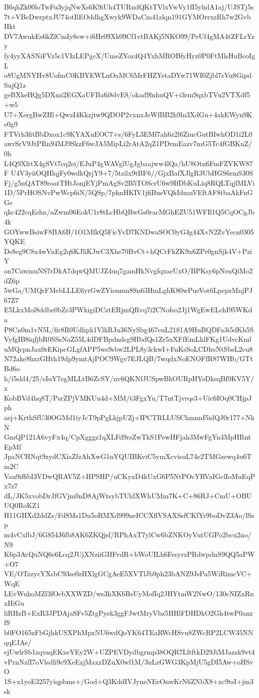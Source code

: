 B6qhZk00loTwFu3yjqNwXs6K9iUh4TURndQKtTVlxVwVy1fI5yhdA1aj/UJSTj5s
7t+VBeDwrptxJU74otIlEOddhgXwyk9WDaCm41zlqn191GYMOrrxzRh7w2GvbHkt
DV7AwukEs6kZlCmIy8ew+i6Hr09Xk09Cf1vtBAKj5NKO99/PeUf4gMA4tZFLrYzy
fy4yyXASNiFVz5c1VIzLEPgcX/UmeZYoz4Q4YxhMROBfyHyz0P0FtMlsHuBcoIgL
o8UgMNYHv8UofmC0KBYEWLnOaMC6MrFHZYetaDYw71WI0Zjbl7sVu8GipdSujQ1z
geBXkeHQg5DXmi2EGXaUFBa6i8dvE8/okad9lnhuQV+i3rm9qxbTVu2VTXdf5+w5
U7+XergBwZHl+QwzI4Kkzjtw9QDOP2vxnxJeWfBB2h9ln3XdGu+4akEWyn9Ke0g9
FTVrh3fitBbDxox1c9KYAXuEOC7+s/6FyL3EMf7ah6z2l6ZiucGutBIwhOD1i2L0
awrSrV9JtPRn94MJ9SkzF6wJA5MipLi2rAtA2qZ1PDrmEazv7mG5Tc4fGBKnZ/0h
L4Q9XlttX4gSVt7cq2ei/EJuP4gWAVglUgJgbaajww4lQa/hU8Otn6FmFZVKW87F
U4V3yiiOQHlqjFy0wdkQrjY9+7/5tzilx9tBF6//GjxBafXJlgR3UbHGS6rmS30S
Fj/g5nQAT89roatTHtJonjEYjPmAgSv2B5TOScrU6w9IfDbKuLiq8RQLTqjlMLVi
1D/5PrHOSNvPwWcp6iN/5QSp/7phnHKIV1jfiBueVQkIdmnVEftAF8tbaAkFnGGe
qkc422cqEshn/nZwm06EokU1r8tLcHbQBwGs0racMGhEZU51WFIl1Q5CqOCgJb4k
GOYwwBsiwF8BA6B/1O1MfkQ5FicYvD7KNDwaSOC0yG4g44XvN2ZvYecn0305YQKE
Ds8eg9C8x4wVnEg2q6KJliKJwC3Xhe70BvCt+hQCrFkZK9x6ZPr0gnSjk4V+PziY
on7CawmuNS7rDkA7dqwQMUJZ4uq7gamHkNvgfqxaeUxO/BPKsy6pNenQiMo2dZ6p
5wGa/UMQrFMebLLLE6yrGwZYioumn8Sn63HmLghK80wPueVot6LpepzMnjPJ67Z7
E5LkxMol8ddbe0bZr3PWkigiDCztERjmQRvq7i2CNofso2Jj1WgEwELchI95WKda
P8Cn0m1vN5L/fir8R0Udhpk1VlkRJu36NySbg467euL2181A9HuBQDFa3i5dKh5S
VyfgIB8iqfjbR0SSsNaZ55L4dDFBpdndsg9HbdQs1Zr5uXFfEmLhlFKg1UdvcKml
uMQcpnJax0rEKipcGLgfAPP5ws9sbw2LPL8y3ckwI+FnKsSoLCDlrsNtSbsL2cu8
N72ake8hzzGHth19dp9ymtAjPOC9Wgv7EJLQB/7wqdxNoENOFfR87WHb/GTtBd6o
h/i5sld4/25/sIuY7egMLLtB6ZcSY/nv6QKNfJUSpwBkOURpHYeDksqBf9KV5Y/x
KobBVd4hq8T/PsrZPjVMKUu4d+MM/t3FgxYu/T7ntTjvrqs3+Uic6IOq0CHjpJph
aej+KrthSfU30OGMd1iyJcT9pPgLkjpUZj+IPCTRLLUSChmnnI5idQJ0r177+NkN
GmQP121A6vyFx4q/CpXgggz1qXLFd9rsZwTkS1PewHFjah3MwFgYn4MpHRntEpMf
JpaNCHNqt9zydCXiaZfzAhXwG1nYQUIBKviC5ymXcvisuL74e2TMGzewq4u6Tm2C
Vau9if6bI3VDwQRAV5Z+HPSHP/uCKyxD4kUxG6P5NtPOcYRVaIGclIoMuEqPx7z7
dL/JK5xvobDrJfGVjm0nD8AjWtsybTUldXWhUMm7K+C+86RJ+CmU+OBUUQ0RoKZ1
H11GHXd2ddZs/Fd8Ms1Du5oRMXd999neICCXflVSAXSsfCKfYr9boDvZ3Ao/lSsp
m4vCxlbJ/6G854J6fb8AK6ZKQjsf/RPhAxT7ylCw6bZNKOyVutUGPo2bcu2no/N9
K6p3AvQuNQ6e6Lcq2JUjXNziiGHFvdR+bWoUILh6FesyrzPRdwpdnS9QQ5aPW+O7
VE/OTzzycYXsbC93se0zHXlgGCgAeE5XVTlJb9ph23bANZ9JsPa5WiRimcVC+WqE
LEvWuhoMZf3fOcbXXWZD/ws3hXK6RsUyMofIq2JHYtmW2NwO/130cNIZxRnxHiGu
liRHzB+ExR3JPDAjaSFv5ZtgPyek3ggFJwtMryVbz5HHlFDHDkO2Gh4twP0anzfS
b0FO165zFbGjhkUSXPhMpxNU6wdQoYK64TEaRWcHSvu8ZWcRP2LCW35NNqqEJAe/
ejUwlrSb1zqvaqEKxeYEy2W+UZPEVDydbgrmp38OQR7LltftkD29JiMJazzk9vt4
vPrnNzfI7oVlsdli9c9XeEzjMaxzDZuX0wf1M/3uLzGWG3KpMjU5gDI5Aw+oHSvO
1S+x1yoE3257yiqpbms+/God+Q3KddIVJyneNEeOnwKrN6ZNbX8+xc9tsI+jm3sk
